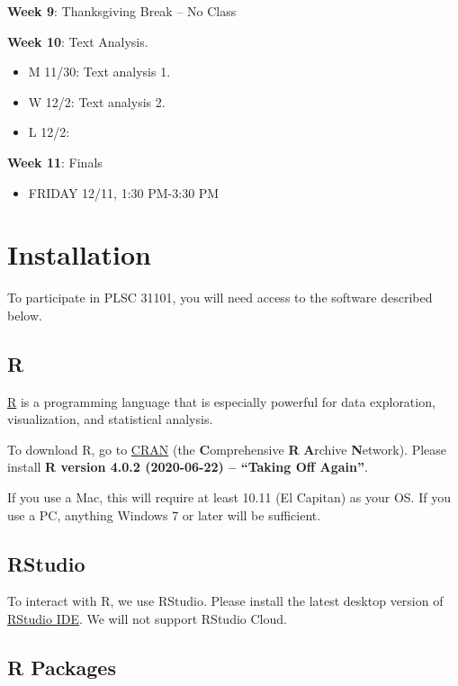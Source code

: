 \documentclass[
]{book}
\providecommand{\tightlist}{%
  \setlength{\itemsep}{0pt}\setlength{\parskip}{0pt}}
\begin{document}
\textbf{Week 9}: Thanksgiving Break -- No Class

\textbf{Week 10}: Text Analysis.

\begin{itemize}
\tightlist
\item
  M 11/30: Text analysis 1.
\item
  W 12/2: Text analysis 2.
\item
  L 12/2:
\end{itemize}

\textbf{Week 11}: Finals

\begin{itemize}
\tightlist
\item
  FRIDAY 12/11, 1:30 PM-3:30 PM
\end{itemize}

\hypertarget{installation}{%
\chapter{Installation}\label{installation}}

To participate in PLSC 31101, you will need access to the software described below.

\hypertarget{r}{%
\section{R}\label{r}}

\href{http://www.r-project.org/}{R} is a programming language that is especially powerful for data exploration, visualization, and statistical analysis.

To download R, go to \href{https://cran.r-project.org/}{CRAN} (the \textbf{C}omprehensive \textbf{R} \textbf{A}rchive \textbf{N}etwork). Please install \textbf{R version 4.0.2 (2020-06-22) -- ``Taking Off Again''}.

If you use a Mac, this will require at least 10.11 (El Capitan) as your OS. If you use a PC, anything Windows 7 or later will be sufficient.

\hypertarget{rstudio}{%
\section{RStudio}\label{rstudio}}

To interact with R, we use RStudio. Please install the latest desktop version of \href{http://www.rstudio.com/ide/download/desktop}{RStudio IDE}. We will not support RStudio Cloud.

\hypertarget{r-packages}{%
\section{R Packages}\label{r-packages}}
\end{document}
